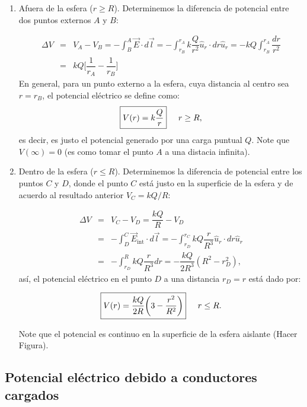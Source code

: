 \begin{enumerate}

\item Afuera de la esfera ($r \geq R$). Determinemos la diferencia de potencial entre dos puntos externos $A$ y $B$:

\begin{eqnarray}
\nonumber
\Delta V &=& V_A-V_B = - \int_B^A \vec{E} \cdot d\vec{l} = - \int_{r_B}^{r_A} k \dfrac{Q}{r^2}\hat{u}_r \cdot dr\hat{u}_r =-kQ \int_{r_B}^{r_A} \dfrac{dr}{r^2} \\ 
&=& kQ \bigg[ \dfrac{1}{r_A} - \dfrac{1}{r_B} \bigg]   
\end{eqnarray}
En general, para un punto externo a la esfera, cuya distancia al centro sea $r=r_B$, el potencial eléctrico se define como:
\begin{eqnarray}
\boxed{V(r)= k \dfrac{Q}{r}} \hspace{0.5 cm} r \geq  R,
\end{eqnarray}
es decir, es justo el potencial generado por una carga puntual $Q$. Note que $V(\infty)=0$ (es como tomar el punto $A$ a una distacia infinita).

\item Dentro de la esfera ($r \leq R$). Determinemos la diferencia de potencial entre los puntos $C$ y $D$, donde el punto $C$ está justo en la superficie de la esfera y de acuerdo al resultado anterior $V_C= kQ/R$:

\begin{eqnarray}
\nonumber
\Delta V &=& V_C -V_D =  \dfrac{kQ}{R} - V_D \\ \nonumber
&=&-\int_D^C \vec{E}_{\mbox{int}} \cdot d\vec{l} 
= -\int_{r_D}^{r_C} kQ \dfrac{r}{R^3}\hat{u}_r \cdot dr\hat{u}_r \\
&=&-\int_{r_D}^{R} kQ \dfrac{r}{R^3} dr = - \dfrac{kQ}{2R^3} (R^2 - r_D^2),
\end{eqnarray}
así, el potencial eléctrico en el punto $D$ a una distancia $r_D=r$ está dado por:

\begin{eqnarray}
\boxed{V(r)=\dfrac{kQ}{2R} \bigg(3-\dfrac{r^2}{R^2}\bigg)} \hspace{0.5 cm} r \leq  R .
\end{eqnarray}

Note que el potencial es continuo en la superficie de la esfera aislante (Hacer Figura).

\end{enumerate}


\subsection{Potencial eléctrico debido a conductores cargados}

